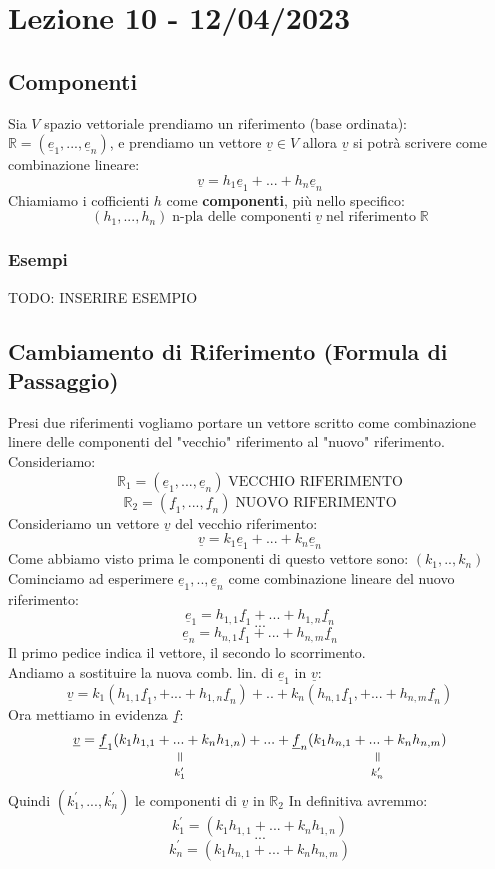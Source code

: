\section{Lezione 10 - 12/04/2023}

\subsection{Componenti}
Sia $V$ spazio vettoriale prendiamo un riferimento (base ordinata): $\mathbb{R} = (\underline{e}_1,...,\underline{e}_n)$, e prendiamo un vettore $\underline{v} \in V$ allora $\underline{v}$ si potrà scrivere come combinazione lineare: 
$$\underline{v} = h_1 \underline{e}_1+...+h_n\underline{e}_n$$
Chiamiamo i cofficienti $h$ come \textbf{componenti}, più nello specifico:
$$ (h_1,...,h_n) \; \text{n-pla delle componenti} \; \underline{v} \; \text{nel riferimento} \; \mathbb{R} $$
\subsubsection{Esempi}
TODO: INSERIRE ESEMPIO

\subsection{Cambiamento di Riferimento (Formula di Passaggio)}
Presi due riferimenti vogliamo portare un vettore scritto come combinazione linere delle componenti del "vecchio" riferimento al "nuovo" riferimento.\\
Consideriamo: 
$$ \mathbb{R}_1 = (\underline{e}_1,...,\underline{e}_n) \; \text{VECCHIO RIFERIMENTO} $$
$$ \mathbb{R}_2 = (\underline{f}_1,...,\underline{f}_n) \;  \text{NUOVO RIFERIMENTO}$$
Consideriamo un vettore $\underline{v}$ del vecchio riferimento:
$$ \underline{v} = k_1\underline{e}_1+...+k_n\underline{e}_n $$
Come abbiamo visto prima le componenti di questo vettore sono: $(k_1,..,k_n)$\\
Cominciamo ad esperimere $\underline{e}_1,..,\underline{e}_n$ come combinazione lineare del nuovo riferimento:
$$\underline{e}_1 = h_{1,1}\underline{f}_1+...+h_{1,n}\underline{f}_n $$
$$ ... $$
$$\underline{e}_n = h_{n,1}\underline{f}_1+...+h_{n,m}\underline{f}_n $$
Il primo pedice indica il vettore, il secondo lo scorrimento.\\
Andiamo a sostituire la nuova comb. lin. di $\underline{e}_1$ in $\underline{v}$:
$$ \underline{v} = k_1(h_{1,1}\underline{f}_1,+...+h_{1,n}\underline{f}_n)+..+k_n(h_{n,1}\underline{f}_1,+...+h_{n,m}\underline{f}_n) $$
Ora mettiamo in evidenza $\underline{f}$:
$$ \underline{v} = \underline{f}_1\equalto{(k_1 h_{1,1}+...+k_n h_{1,n})}{k_1^{\prime}}+...+\underline{f}_n\equalto{(k_1 h_{n,1}+...+k_n h_{n,m})}{k_n^{\prime}} $$
Quindi $(k_1^{\prime},...,k_n^{\prime})$ le componenti di $\underline{v}$ in $\mathbb{R}_2$
In definitiva avremmo:
$$ k_1^{\prime} = (k_1 h_{1,1}+...+k_n h_{1,n})  $$
$$ ... $$
$$ k_n^{\prime} = (k_1 h_{n,1}+...+k_n h_{n,m})  $$

